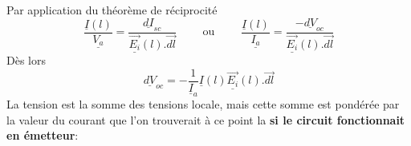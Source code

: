 	Par application du théorème de réciprocité
	\begin{equation}
	\dfrac{\underline{I}(l)}{\underline{V_a}} = \dfrac{\underline{dI}_{sc}}{\underline{\vec{E_i}}(l).
	\vec{dl}}\qquad\text{ ou }\qquad
	\dfrac{\underline{I}(l)}{\underline{I_a}} = \dfrac{-\underline{dV}_{oc}}{\underline{\vec{E_i}}(l).
	\vec{dl}}
	\end{equation}
	Dès lors
	\begin{equation}
	\underline{dV}_{oc} = -\dfrac{1}{\underline{I}_a}\underline{I}(l)\underline{\vec{E_i}}(l).\vec{dl}
	\end{equation}
	La tension est la somme des tensions locale, mais cette somme est pondérée par la valeur du courant 
	que l'on trouverait à ce point la \textbf{si le circuit fonctionnait en émetteur}:\\
	
	
	
	
	
	
	
	
	
	